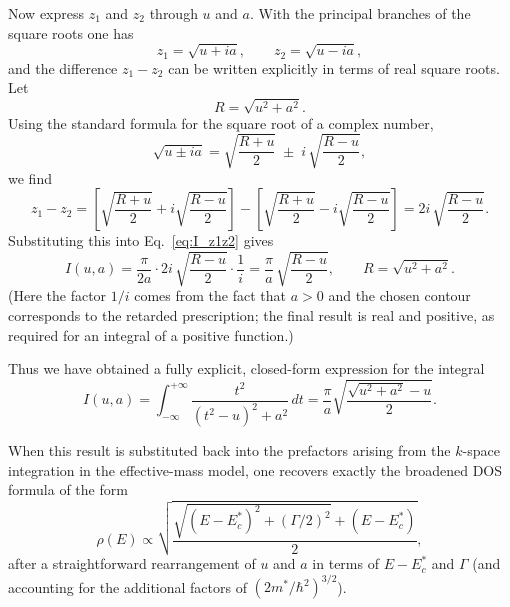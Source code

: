 Now express $z_1$ and $z_2$ through $u$ and $a$. With the principal branches of the square roots one has
\begin{equation}
z_1 = \sqrt{u + i a},
\qquad
z_2 = \sqrt{u - i a},
\end{equation}
and the difference $z_1 - z_2$ can be written explicitly in terms of real square roots. Let
\[
R = \sqrt{u^2 + a^2}.
\]
Using the standard formula for the square root of a complex number,
\begin{equation}
\sqrt{u \pm i a}
=
\sqrt{\frac{R + u}{2}}
\;\pm\; i\,\sqrt{\frac{R - u}{2}},
\end{equation}
we find
\begin{equation}
z_1 - z_2
=
\left[
\sqrt{\frac{R + u}{2}} + i\sqrt{\frac{R - u}{2}}
\right]
-
\left[
\sqrt{\frac{R + u}{2}} - i\sqrt{\frac{R - u}{2}}
\right]
=
2i\,\sqrt{\frac{R - u}{2}}.
\end{equation}
Substituting this into Eq.~\eqref{eq:I_z1z2} gives
\begin{equation}
I(u,a)
=
\frac{\pi}{2a} \cdot 2i\,\sqrt{\frac{R - u}{2}}
\cdot \frac{1}{i}
=
\frac{\pi}{a}\,
\sqrt{\frac{R - u}{2}},
\qquad
R = \sqrt{u^2 + a^2}.
\end{equation}
(Here the factor $1/i$ comes from the fact that $a>0$ and the chosen contour corresponds to the retarded prescription; the final result is real and positive, as required for an integral of a positive function.)

Thus we have obtained a fully explicit, closed-form expression for the integral
\begin{equation}
I(u,a) 
=
\int_{-\infty}^{+\infty}
\frac{t^2}{(t^2 - u)^2 + a^2}\,dt
=
\frac{\pi}{a}
\sqrt{\frac{\sqrt{u^2 + a^2} - u}{2}}.
\label{eq:I_final_manual}
\end{equation}

When this result is substituted back into the prefactors arising from the $k$-space integration in the effective-mass model, one recovers exactly the broadened DOS formula of the form
\begin{equation}
\rho(E)
\propto
\sqrt{
\frac{
\sqrt{(E-E_c^*)^2 + (\Gamma/2)^2} + (E-E_c^*)
}{2}
},
\end{equation}
after a straightforward rearrangement of $u$ and $a$ in terms of $E-E_c^*$ and $\Gamma$ (and accounting for the additional factors of $(2m^\ast/\hbar^2)^{3/2}$).
